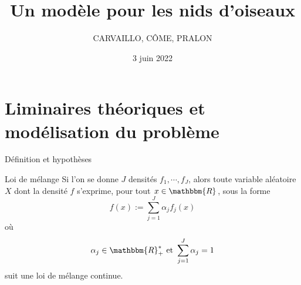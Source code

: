 \documentclass[11pt]{beamer}
\begin{document}
	\author{CARVAILLO, CÔME, PRALON}
	\title[Projet UE HAX817X]{Un modèle pour les nids d'oiseaux}
	\subtitle{}
	\date{3 juin 2022}
	\frame{\titlepage}
	
	
	\section{Liminaires théoriques et modélisation du problème}
	
	\begin{frame}{Définition et hypothèses}
		\begin{block}{Loi de mélange}
			Si l'on se donne $J$  densités $f_1, \cdots, f_J$, alors toute variable aléatoire $X$ dont la densité $f$ s'exprime, pour tout $x\in\mathbbm{R}$, sous la forme
			\[
			f(x) := \displaystyle\sum_{j=1}^J \alpha_j f_j(x)
			\]
			où
			\[
			\alpha_j \in\mathbbm{R}_+^* \text{ et } \displaystyle\sum_{j=1}^J\alpha_j=1
			\]
			suit une loi de mélange continue.
		\end{block}
	\end{frame}
	
\end{document}
